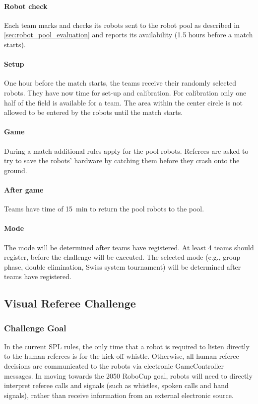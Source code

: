             \paragraph{Robot check} Each team marks and checks its robots sent to the robot pool as described in \cref{sec:robot_pool_evaluation} and reports its availability (1.5 hours before a match starts).
            \paragraph{Setup} One hour before the match starts, the teams receive their randomly selected robots. They have now time for set-up and calibration. For calibration only one half of the field is available for a team. The area within the center circle is not allowed to be entered by the robots until the match starts.
            \paragraph{Game} During a match additional rules apply for the pool robots. Referees are asked to try to save the robots' hardware by catching them before they crash onto the ground.
            \paragraph{After game} Teams have time of \qty{15}{\minute} to return the pool robots to the pool.

        \paragraph{Mode}
            The mode will be determined after teams have registered. At least 4 teams should register, before the challenge will be executed. The selected mode (e.g., group phase, double elimination, Swiss system tournament) will be determined after teams have registered.

\subsection{Visual Referee Challenge}

    \subsubsection{Challenge Goal}

        In the current SPL rules, the only time that a robot is required to listen directly to the human referees is for the kick-off whistle. Otherwise, all human referee decisions are communicated to the robots via electronic GameController messages. In moving towards the 2050 RoboCup goal, robots will need to directly interpret referee calls and signals (such as whistles, spoken calls and hand signals), rather than receive information from an external electronic source.
        
